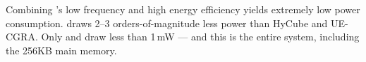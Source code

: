 Combining \riptide's low frequency and high energy efficiency
yields extremely low power consumption.
%
\riptide draws 2--3 orders-of-magnitude less power
than HyCube and UE-CGRA.
%
Only \snafu and \riptide draw less than 1\,mW ---
and this is the entire system, including the 256KB main memory.
    
